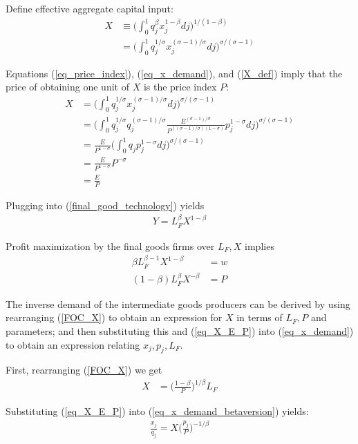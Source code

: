 \documentclass[12pt,english]{article}
\theoremstyle{remark}
\begin{document}
Define effective aggregate capital input:
\begin{align}
X &\equiv \Big( \int_0^1 q_j^{\beta} x_j^{1-\beta} dj \Big)^{1/(1-\beta)} \\
  &= \Big( \int_0^1 q_j^{1/\sigma} x_j^{(\sigma - 1)/\sigma} dj \Big)^{\sigma/(\sigma - 1)} \label{X_def}
\end{align}

Equations (\ref{eq_price_index}), (\ref{eq_x_demand}), and (\ref{X_def}) imply that the price of obtaining one unit of $X$ is the price index $P$: 
\begin{align}
X &= \Big(\int_0^1 q_j^{1/\sigma} x_j^{(\sigma - 1)/\sigma} dj \Big) ^{\sigma/(\sigma -1)} \nonumber \\
  &= \Big(\int_0^1 q_j^{1/\sigma} q_j^{(\sigma - 1)/\sigma} \frac{E^{(\sigma-1)/\sigma}}{P^{((\sigma -1)/\sigma) (1-\sigma)}} p_j^{1-\sigma}dj \Big) ^{\sigma/(\sigma -1)} \nonumber \\
  &= \frac{E}{P^{1-\sigma}} \Big( \int_0^1 q_j p_j^{1-\sigma} dj \Big)^{\sigma/(\sigma -1)} \nonumber \\
  &= \frac{E}{P^{1-\sigma}}P^{-\sigma} \nonumber \\
  &= \frac{E}{P} \label{eq_X_E_P}
\end{align}

Plugging into (\ref{final_good_technology}) yields 
\begin{align*}
Y = L_F^{\beta} X^{1-\beta} 
\end{align*}

Profit maximization by the final goods firms over $L_F,X$ implies
\begin{align}
\beta L_F^{\beta -1} X^{1-\beta} &= w \label{FOC_L} \\ 
(1-\beta) L_F^{\beta} X^{-\beta} &= P \label{FOC_X}
\end{align}

The inverse demand of the intermediate goods producers can be derived by using rearranging (\ref{FOC_X}) to obtain an expression for $X$ in terms of $L_F,P$ and parameters; and then substituting this and (\ref{eq_X_E_P}) into (\ref{eq_x_demand}) to obtain an expression relating $x_j,p_j,L_F$.

First, rearranging (\ref{FOC_X}) we get 
\begin{align}
X &= \Big(\frac{1-\beta}{P}\Big)^{1/\beta} L_F \label{big_X_eq}
\end{align}

Substituting (\ref{eq_X_E_P}) into (\ref{eq_x_demand_betaversion}) yields:
\begin{align}
\frac{x_j}{q_j} = X \Big(\frac{p_j}{P}\Big)^{-1/\beta} \label{x_demand_X}
\end{align}
\end{document}
